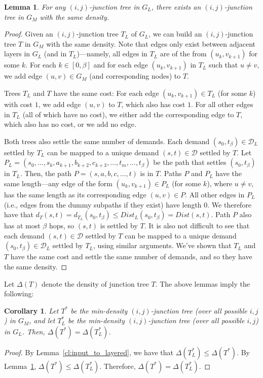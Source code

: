 \documentclass{article}
\newtheorem{corollary}[theorem]{Corollary}
\newtheorem{lemma}[theorem]{Lemma}
\theoremstyle{definition}
\theoremstyle{remark}
\begin{document}
\begin{lemma}
\label{cl:layered_to_input}
    For any $(i,j)$-junction tree in $G_L$, there exists an $(i,j)$-junction tree in $G_M$ with the same density.
\end{lemma}
\begin{proof}
     Given an $(i,j)$-junction tree $T_L$ of $G_L$, we can build an $(i,j)$-junction tree $T$ in $G_M$ with the same density. Note that edges only exist between adjacent layers in $G_L$ (and in $T_L$)---namely, all edges in $T_L$ are of the from $(u_k, v_{k+1})$ for some $k$. For each $k \in [0, \beta]$ and for each edge $(u_k, v_{k+1})$ in $T_L$ such that $u \neq v$, we add edge $(u, v) \in G_M$ (and corresponding nodes) to $T$. 
    
    Trees $T_L$ and $T$ have the same cost: For each edge $(u_k, v_{k+1}) \in T_L$ (for some $k$) with cost $1$, we add edge $(u,v)$ to $T$, which also has cost $1$. For all other edges in $T_L$ (all of which have no cost), we either add the corresponding edge to $T$, which also has no cost, or we add no edge. 
    
    Both trees also settle the same number of demands. Each demand $(s_0, t_\beta) \in \mathcal{D}_L$ settled by $T_L$ can be mapped to a unique demand $(s,t) \in \mathcal{D}$ settled by $T$. Let $P_L = (s_0, \dots, s_k, a_{k+1}, b_{k+2}, c_{k+3}, \dots, t_{m}, \dots , t_\beta )$ be the path that settles $(s_0, t_\beta)$ in $T_L$. Then, the path $P = (s, a, b, c, \dots, t)$ is in $T$. Paths $P$ and $P_L$ have the same length---any edge of the form $(u_k,v_{k+1}) \in P_L$ (for some $k$), where $u \neq v$, has the same length as its corresponding edge $(u, v) \in P$. All other edges in $P_L$ (i.e., edges from the dummy subpaths if they exist) have length $0$. We therefore have that $d_T(s,t) = d_{T_L}(s_0,t_\beta) \leq Dist_{L}(s_0,t_\beta) = Dist(s,t)$. Path $P$ also has at most $\beta$ hops, so $(s,t)$ is settled by $T$. It is also not difficult to see that each demand $(s, t) \in \mathcal{D}$ settled by $T$ can be mapped to a unique demand $(s_0,t_\beta) \in \mathcal{D}_L$ settled by $T_L$, using similar arguments. We've shown that $T_L$ and $T$ have the same cost and settle the same number of demands, and so they have the same density.
\end{proof}

Let $\Delta(T)$ denote the density of junction tree $T$. The above lemmas imply the following:

\begin{corollary}
\label{cor:equivalent}
    Let $T^*$ be the min-density $(i,j)$-junction tree (over all possible $i,j$) in $G_M$, and let $T_L^*$ be the min-density $(i,j)$-junction tree (over all possible $i,j$) in $G_L$. Then, $\Delta(T^*) = \Delta(T_L^*)$.
\end{corollary}
\begin{proof}
    By Lemma~\ref{cl:input_to_layered}, we have that $\Delta(T_L^*) \leq \Delta(T^*)$.  By Lemma~\ref{cl:layered_to_input}, $\Delta(T^*) \leq \Delta(T_L^*)$. Therefore, $\Delta(T^*) = \Delta(T_L^*)$.
\end{proof}
\end{document}
